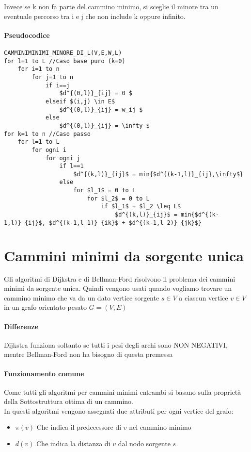\documentclass[12pt, a4paper, openany]{book}
\begin{document}
Invece se k non fa parte del cammino minimo, si sceglie il minore tra un eventuale percorso tra i e j che non include k oppure infinito.

\paragraph{Pseudocodice}

\begin{lstlisting}[mathescape=true]
CAMMINIMINIMI_MINORE_DI_L(V,E,W,L)
for l=1 to L //Caso base puro (k=0)
    for i=1 to n
        for j=1 to n
            if i==j
                $d^{(0,l)}_{ij} = 0 $
            elseif $(i,j) \in E$
                $d^{(0,l)}_{ij} = w_ij $
            else
                $d^{(0,l)}_{ij} = \infty $
for k=1 to n //Caso passo
    for l=1 to L
        for ogni i
            for ogni j
                if l==1
                    $d^{(k,l)}_{ij}$ = min{$d^{(k-1,l)}_{ij},\infty$} 
                else
                    for $l_1$ = 0 to L
                        for $l_2$ = 0 to L
                            if $l_1$ + $l_2 \leq L$
                                $d^{(k,l)}_{ij}$ = min{$d^{(k-1,l)}_{ij}$, $d^{(k-1,l_1)}_{ik}$ + $d^{(k-1,l_2)}_{jk}$} 
\end{lstlisting}

\section{Cammini minimi da sorgente unica}
Gli algoritmi di Dijkstra e di Bellman-Ford risolvono il problema dei cammini minimi da sorgente unica.
Quindi vengono usati quando vogliamo trovare un cammino minimo che va da un dato vertice sorgente $s \in V$ a
ciascun vertice $v \in V$ in un grafo orientato pesato $G = (V, E)$

\paragraph{Differenze}
Dijkstra funziona soltanto se tutti i pesi degli archi sono NON NEGATIVI, mentre
Bellman-Ford non ha bisogno di questa premessa

\paragraph{Funzionamento comune}
Come tutti gli algoritmi per cammini minimi entrambi si basano sulla
proprietà della Sottostruttura ottima di un cammino.\\
In questi algoritmi vengono assegnati due attributi per ogni vertice del grafo:
\begin{itemize}
    \item $\pi(v)$ Che indica il predecessore di $v$ nel cammino minimo
    \item $d(v)$ Che indica la distanza di $v$ dal nodo sorgente $s$
\end{itemize}
\end{document}
